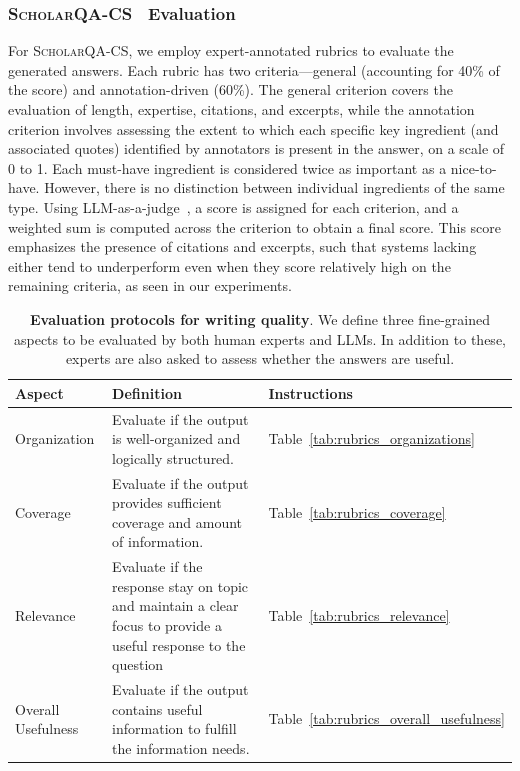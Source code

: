 \subsubsection{\textsc{ScholarQA-CS} \acc~Evaluation}
\label{app_sec:details_scholar_cs}
For \textsc{ScholarQA-CS}, we employ expert-annotated rubrics to evaluate the generated answers. 
Each rubric has two criteria---general (accounting for 40\% of the score) and annotation-driven (60\%). 
The general criterion covers the evaluation of length, expertise, citations, and excerpts, while the annotation criterion involves assessing the extent to which each specific key ingredient (and associated quotes) identified by annotators is present in the answer, on a scale of 0 to 1.
{Each must-have ingredient is considered twice as important as a nice-to-have. However, there is no distinction between individual ingredients of the same type.}
Using LLM-as-a-judge~\citep{zheng2023judging}, a score is assigned for each criterion, and a weighted sum is computed across the criterion to obtain a final score.  This score emphasizes the presence of citations and excerpts, such that systems lacking either tend to underperform even when they score relatively high on the remaining criteria, as seen in our experiments. 

\begin{table}[t!]
\small
    \centering
    \begin{tabular}{p{2cm} |p{9cm} | l }
    \toprule
        \textbf{Aspect} & \textbf{Definition}  & \textbf{Instructions}\\
    \midrule
    Organization  & Evaluate if the output is well-organized and logically structured.  & Table~\ref{tab:rubrics_organizations}\\
    Coverage & Evaluate if the output provides sufficient coverage and amount of information. & Table~\ref{tab:rubrics_coverage} \\
    Relevance & Evaluate if the response stay on topic and maintain a clear focus to provide a useful response to the question &  Table~\ref{tab:rubrics_relevance} \\ 
    Overall Usefulness  & Evaluate if the output contains useful information to fulfill the information needs. & Table~\ref{tab:rubrics_overall_usefulness} \\ 
    \bottomrule
    \end{tabular}
        \caption{{\bf Evaluation protocols for writing quality}. We define three fine-grained aspects to be evaluated by both human experts and LLMs. In addition to these, experts are also asked to assess whether the answers are useful.
    }
    \label{table:evaluation_protocols}
\end{table}

